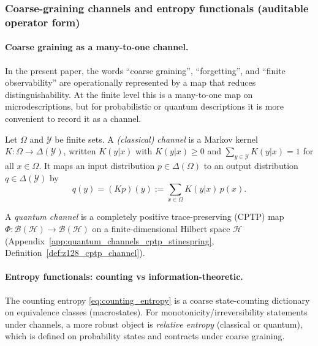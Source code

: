 \subsubsection{Coarse-graining channels and entropy functionals (auditable operator form)}
\label{subsec:thermo_channels_entropy_functionals}

\paragraph{Coarse graining as a many-to-one channel.}
\InterfaceTag In the present paper, the words ``coarse graining'', ``forgetting'', and ``finite observability'' are operationally represented by a map that reduces distinguishability.
At the finite level this is a many-to-one map on microdescriptions, but for probabilistic or quantum descriptions it is more convenient to record it as a channel.

\begin{definition}\label{def:z128_classical_channel}
\MathTag Let $\Omega$ and $\mathcal{Y}$ be finite sets.
A \emph{(classical) channel} is a Markov kernel $K:\Omega\to\Delta(\mathcal{Y})$, written $K(y|x)$ with $K(y|x)\ge 0$ and $\sum_{y\in\mathcal{Y}}K(y|x)=1$ for all $x\in\Omega$.
It maps an input distribution $p\in\Delta(\Omega)$ to an output distribution $q\in\Delta(\mathcal{Y})$ by
\[
q(y)=(Kp)(y):=\sum_{x\in\Omega}K(y|x)\,p(x).
\]
\end{definition}

\begin{definition}\label{def:z128_quantum_channel_thermo}
\MathTag A \emph{quantum channel} is a completely positive trace-preserving (CPTP) map $\Phi:\mathcal{B}(\mathcal{H})\to\mathcal{B}(\mathcal{H})$ on a finite-dimensional Hilbert space $\mathcal{H}$ (Appendix~\ref{app:quantum_channels_cptp_stinespring}, Definition~\ref{def:z128_cptp_channel}).
\end{definition}

\paragraph{Entropy functionals: counting vs information-theoretic.}
\InterfaceTag The counting entropy \eqref{eq:counting_entropy} is a coarse state-counting dictionary on equivalence classes (macrostates).
For monotonicity/irreversibility statements under channels, a more robust object is \emph{relative entropy} (classical or quantum), which is defined on probability states and contracts under coarse graining.


